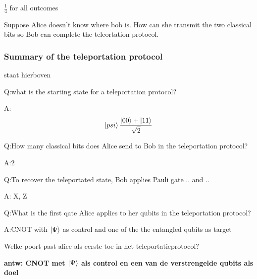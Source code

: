 \documentclass[a4paper, addpoints, 12pt
    , noanswers    %
    ]{exam}
\begin{document}
\begin{questions}
$\tfrac{1}{4}$ for all outcomes

Suppose Alice doesn't know where bob is. How can she transmit the two classical bits so Bob can complete the teleortation protocol.

\subsubsection*{Summary of the teleportation protocol}
staat hierboven 

Q:what is the starting state for a teleportation protocol?

A:$$\ket{\\psi}\frac{\ket{00}+\ket{11}}{\sqrt{2}}$$

Q:How many classical bits does Alice send to Bob in the teleportation protocol?

A:2

Q:To recover the teleportated state, Bob applies Pauli gate .. and ..

A: X, Z

Q:What is the first qate Alice applies to her qubits in the teleportation protocol?

A:CNOT with $\ket{\Psi}$ as control and one of the the entangled qubits as target 

\question[1]
Welke poort past alice als eerste toe in het teleportatieprotocol?

\ifprintanswers
\textbf{antw:
CNOT met $\ket{\Psi}$ als control en een van de verstrengelde qubits als doel 
}
\else
\fillwithlines{.5in}
\fi


\end{questions}
\end{document}
